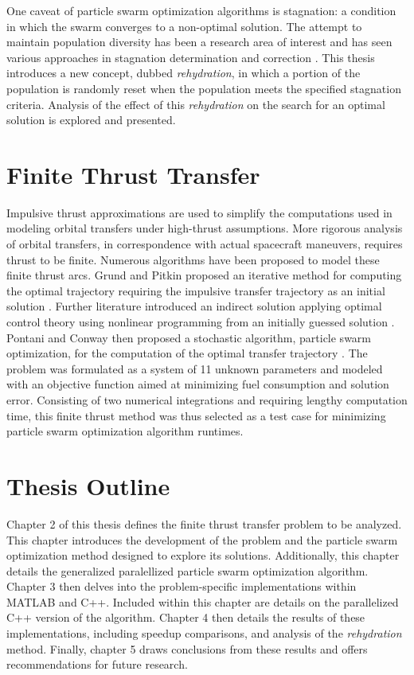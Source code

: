 \noindent One caveat of particle swarm optimization algorithms is stagnation: a condition in which the swarm converges to a non-optimal solution. The attempt to maintain population 
diversity has been a research area of interest and has seen various approaches in stagnation determination and correction \citep{PSOstag1, PSOstag2}. This thesis introduces a new concept,
dubbed \textit{rehydration}, in which a portion of the population is randomly reset when the population meets the specified stagnation criteria. Analysis of the effect of this
\textit{rehydration} on the search for an optimal solution is explored and presented.

\section{Finite Thrust Transfer}

\noindent Impulsive thrust approximations are used to simplify the computations used in modeling orbital transfers under high-thrust assumptions.
More rigorous analysis of orbital transfers, in correspondence with actual spacecraft maneuvers, requires thrust to be finite. Numerous algorithms have been
proposed to model these finite thrust arcs. Grund and Pitkin proposed an iterative method for computing the optimal trajectory requiring the impulsive transfer trajectory as
an initial solution \citep{Fthrust1}. Further literature introduced an indirect solution applying optimal control theory using nonlinear programming from an initially guessed
solution \citep{Fthrust2}. Pontani and Conway then proposed a stochastic algorithm, particle swarm optimization, for the computation of the optimal transfer trajectory \citep{Pontani_Conway}. The problem was formulated as 
a system of 11 unknown parameters and modeled with an objective function aimed at minimizing fuel consumption
and solution error. Consisting of two numerical integrations and requiring lengthy computation time, this finite thrust 
method was thus selected as a test case for minimizing particle swarm optimization algorithm runtimes.


\section{Thesis Outline}

\noindent Chapter 2 of this thesis defines the finite thrust transfer problem to be analyzed. This chapter introduces the development of the problem
and the particle swarm optimization method designed to explore its solutions. Additionally, this chapter details the generalized paralellized particle swarm optimization algorithm.
Chapter 3 then delves into the problem-specific implementations within MATLAB and C++. Included within
this chapter are details on the parallelized C++ version of the algorithm. 
Chapter 4 then details the results of these implementations, including speedup comparisons, and analysis of the \textit{rehydration} method.
Finally, chapter 5 draws conclusions from these results and offers recommendations for future research. 
